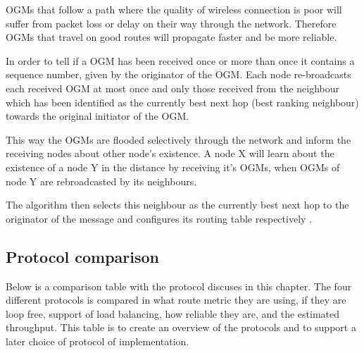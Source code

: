 OGMs that follow a path where the quality of wireless connection is poor will suffer from packet loss or delay on their way through the network.
Therefore OGMs that travel on good routes will propagate faster and be more reliable\cite{BATMAN}.

In order to tell if a OGM has been received once or more than once it contains a sequence number, given by the originator of the OGM.
Each node re-broadcasts each received OGM at most once and only those received from the neighbour which has been identified as the currently best next hop (best ranking neighbour) towards the original initiator of the OGM.

This way the OGMs are flooded selectively through the network and inform the receiving nodes about other node's existence. 
A node X will learn about the existence of a node Y in the distance by receiving it's OGMs, when OGMs of node Y are rebroadcasted by its neighbours.

The algorithm then selects this neighbour as the currently best next hop to the originator of the message and configures its routing table respectively \cite{BATMAN}.

\subsection{Protocol comparison}
Below is a comparison table with the protocol discuses in this chapter.
The four different protocols is compared in what route metric they are using, if they are loop free, support of load balancing, how reliable they are, and the estimated throughput.
This table is to create an overview of the protocols and to support a later choice of protocol of implementation.


